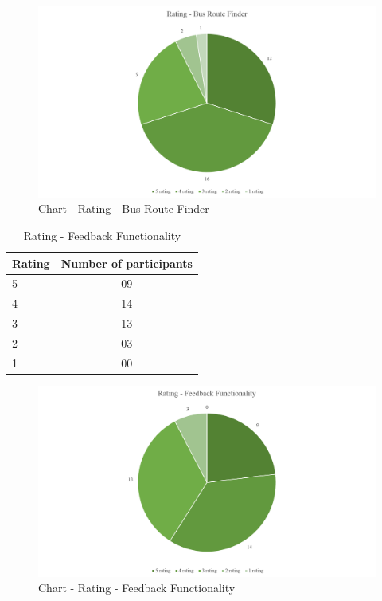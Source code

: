 \begin {itemize}
\begin {figure} [h]
\centering
\includegraphics [scale=0.5] {ratingBusRouteFinder}
\caption [Chart - Rating - Bus Route Finder] {Chart - Rating - Bus Route Finder}
\label {image-ratingBusRouteFinder}
\end {figure}

\begin{table} [h]
\centering
\begin{tabular}{|l|c|}
\hline
Rating & Number of participants \\
\hline
5	&09 \\
4	&14 \\
3	&13 \\
2	&03 \\
1	&00 \\
\hline
\end{tabular}
\caption{Rating - Feedback Functionality}
\label{table-survey-rating-FeedbackFunctionality}
\end{table}

\begin {figure} [h]
\centering
\includegraphics [scale=0.5] {ratingFeedbackFunctionality}
\caption [Chart - Rating - Feedback Functionality] {Chart - Rating - Feedback Functionality}
\label {image-ratingFeedbackFunctionality}
\end {figure}


\end{itemize}
